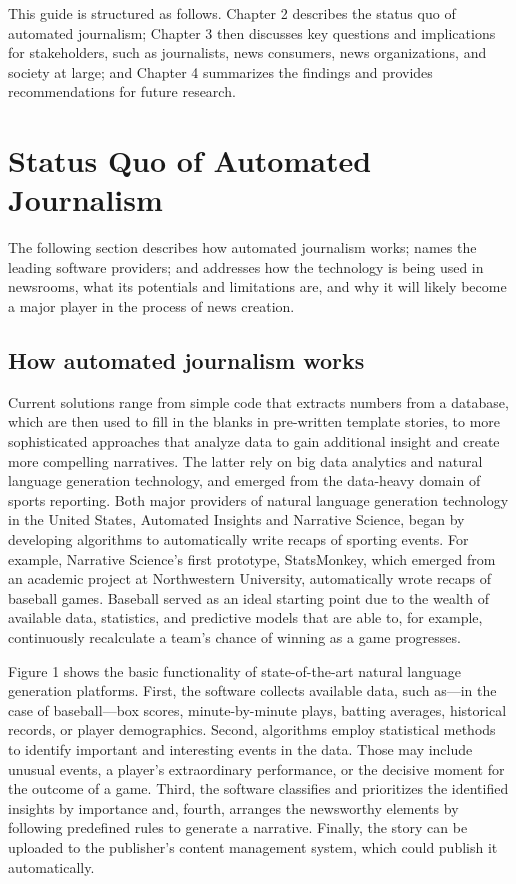 \documentclass[notoc, symmetric, nobib, nols]{towcenter-guideto-book}
\begin{document}
This guide is structured as follows. Chapter 2 describes the status quo of automated journalism; Chapter 3 then discusses key questions and implications for stakeholders, such as journalists, news consumers, news organizations, and society at large; and Chapter 4 summarizes the findings and provides recommendations for future research.
 
\chapter{Status Quo of Automated Journalism}

The following section describes how automated journalism works; names the leading software providers; and addresses how the technology is being used in newsrooms, what its potentials and limitations are, and why it will likely become a major player in the process of news creation.

\section{How automated journalism works}

Current solutions range from simple code that extracts numbers from a database, which are then used to fill in the blanks in pre-written template stories, to more sophisticated approaches that analyze data to gain additional insight and create more compelling narratives. The latter rely on big data analytics and natural language generation technology, and emerged from the data-heavy domain of sports reporting. Both major providers of natural language generation technology in the United States, Automated Insights and Narrative Science, began by developing algorithms to automatically write recaps of sporting events. For example, Narrative Science's first prototype, StatsMonkey, which emerged from an academic project at Northwestern University, automatically wrote recaps of baseball games.\autocite{levy12} Baseball served as an ideal starting point due to the wealth of available data, statistics, and predictive models that are able to, for example, continuously recalculate a team's chance of winning as a game progresses. 

Figure 1 shows the basic functionality of state-of-the-art natural language generation platforms.\autocites{reiter2000,doerr15} First, the software collects available data, such as---in the case of baseball---box scores, minute-by-minute plays, batting averages, historical records, or player demographics. Second, algorithms employ statistical methods to identify important and interesting events in the data. Those may include unusual events, a player's extraordinary performance, or the decisive moment for the outcome of a game. Third, the software classifies and prioritizes the identified insights by importance and, fourth, arranges the newsworthy elements by following predefined rules to generate a narrative. Finally, the story can be uploaded to the publisher's content management system, which could publish it automatically. 
\end{document}
